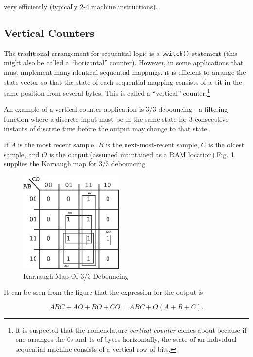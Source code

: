 \documentclass[letterpaper,10pt,titlepage]{article}
\begin{document}
\noindent{}very efficiently (typically 2-4 machine instructions).



\subsection{Vertical Counters}
\label{sfrr0:svcn0}

The traditional arrangement for sequential logic is a
\texttt{switch()} statement (this might also be called
a ``horizontal'' counter).  However, in some applications that must 
implement many identical sequential mappings, it is 
efficient to arrange the state vector so that the state of each sequential
mapping consists of a bit in the same position from several bytes.  This
is called a ``vertical'' counter.\footnote{It is suspected that the nomenclature
\emph{vertical counter} comes about because if one arranges the 0s and 1s of
bytes horizontally, the state of an individual sequential machine consists
of a vertical row of bits.}

An example of a vertical counter application is 3/3 debouncing---a filtering
function where a discrete input must be in the same state for 3 consecutive
instants of discrete time before the output may change to that state.

If $A$ is the most recent sample, $B$ is the next-most-recent sample,
$C$ is the oldest sample, and $O$ is the output (assumed maintained
as a RAM location) Fig. \ref{fig:sfrr0:svcn0:00} 
supplies the Karnaugh map for 3/3
debouncing.

\begin{figure}
\centering
\includegraphics[height=2.0in]{kmap33db.eps}
\caption{Karnaugh Map Of 3/3 Debouncing}
\label{fig:sfrr0:svcn0:00}
\end{figure}

It can be seen from the figure that the expression for the output is

\begin{equation}
\label{eq:sfrr0:svcn0:01}
ABC + AO + BO + CO = ABC + O(A + B + C).
\end{equation}
\end{document}
